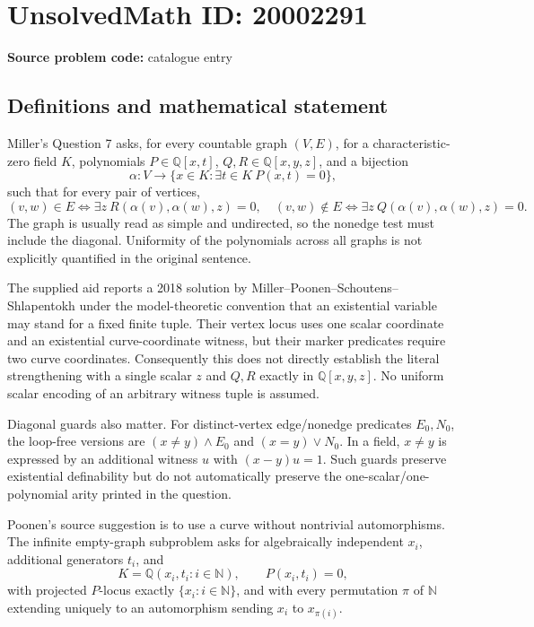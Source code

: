 \documentclass[11pt]{article}
\newcommand{\N}{\mathbb{N}}
\newcommand{\Q}{\mathbb{Q}}
\begin{document}
\section*{UnsolvedMath ID: 20002291}
\textbf{Source problem code:} catalogue entry
\subsection{Definitions and mathematical statement}
Miller's Question 7 asks, for every countable graph \((V,E)\), for a characteristic-zero field \(K\), polynomials \(P\in\Q[x,t]\), \(Q,R\in\Q[x,y,z]\), and a bijection
\[
\alpha:V\longrightarrow\{x\in K:\exists t\in K\ P(x,t)=0\},
\]
such that for every pair of vertices,
\[
(v,w)\in E\Longleftrightarrow\exists z\ R(\alpha(v),\alpha(w),z)=0,
\quad
(v,w)\notin E\Longleftrightarrow\exists z\ Q(\alpha(v),\alpha(w),z)=0.
\]
The graph is usually read as simple and undirected, so the nonedge test must include the diagonal. Uniformity of the polynomials across all graphs is not explicitly quantified in the original sentence.

The supplied aid reports a 2018 solution by Miller--Poonen--Schoutens--Shlapentokh under the model-theoretic convention that an existential variable may stand for a fixed finite tuple. Their vertex locus uses one scalar coordinate and an existential curve-coordinate witness, but their marker predicates require two curve coordinates. Consequently this does not directly establish the literal strengthening with a single scalar \(z\) and \(Q,R\) exactly in \(\Q[x,y,z]\). No uniform scalar encoding of an arbitrary witness tuple is assumed.

Diagonal guards also matter. For distinct-vertex edge/nonedge predicates \(E_0,N_0\), the loop-free versions are \((x\ne y)\wedge E_0\) and \((x=y)\vee N_0\). In a field, \(x\ne y\) is expressed by an additional witness \(u\) with \((x-y)u=1\). Such guards preserve existential definability but do not automatically preserve the one-scalar/one-polynomial arity printed in the question.

Poonen's source suggestion is to use a curve without nontrivial automorphisms. The infinite empty-graph subproblem asks for algebraically independent \(x_i\), additional generators \(t_i\), and
\[
K=\Q(x_i,t_i:i\in\N),\qquad P(x_i,t_i)=0,
\]
with projected \(P\)-locus exactly \(\{x_i:i\in\N\}\), and with every permutation \(\pi\) of \(\N\) extending uniquely to an automorphism sending \(x_i\) to \(x_{\pi(i)}\).
\end{document}
